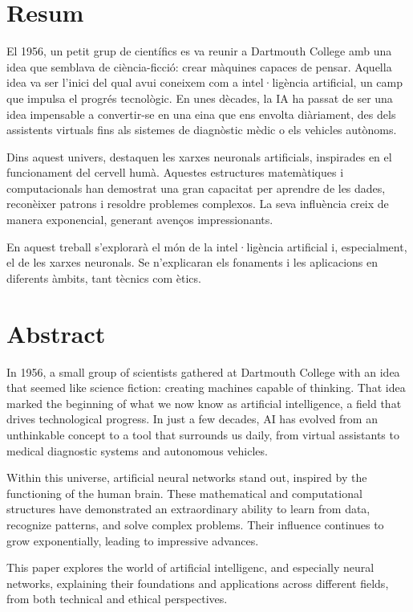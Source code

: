 %
%
\section*{Resum}
El 1956, un petit grup de científics es va reunir a Dartmouth College amb una idea que semblava de ciència-ficció: crear màquines capaces de pensar. Aquella idea va ser l'inici del qual avui coneixem com a intel·ligència artificial, un camp que impulsa el progrés tecnològic. En unes dècades, la IA ha passat de ser una idea impensable a convertir-se en una eina que ens envolta diàriament, des dels assistents virtuals fins als sistemes de diagnòstic mèdic o els vehicles autònoms.\par

Dins aquest univers, destaquen les xarxes neuronals artificials, inspirades en el funcionament del cervell humà. Aquestes estructures matemàtiques i computacionals han demostrat una gran capacitat per aprendre de les dades, reconèixer patrons i resoldre problemes complexos. La seva influència creix de manera exponencial, generant avenços impressionants.\par

En aquest treball s'explorarà el món de la intel·ligència artificial i, especialment, el de les xarxes neuronals. Se n'explicaran els fonaments i les aplicacions en diferents àmbits, tant tècnics com ètics.
%
%
\section*{Abstract}
In 1956, a small group of scientists gathered at Dartmouth College with an idea that seemed like science fiction: creating machines capable of thinking. That idea marked the beginning of what we now know as artificial intelligence, a field that drives technological progress. In just a few decades, AI has evolved from an unthinkable concept to a tool that surrounds us daily, from virtual assistants to medical diagnostic systems and autonomous vehicles.\par

Within this universe, artificial neural networks stand out, inspired by the functioning of the human brain. These mathematical and computational structures have demonstrated an extraordinary ability to learn from data, recognize patterns, and solve complex problems. Their influence continues to grow exponentially, leading to impressive advances.\par

This paper explores the world of artificial intelligenc, and especially neural networks, explaining their foundations and applications across different fields, from both technical and ethical perspectives.


